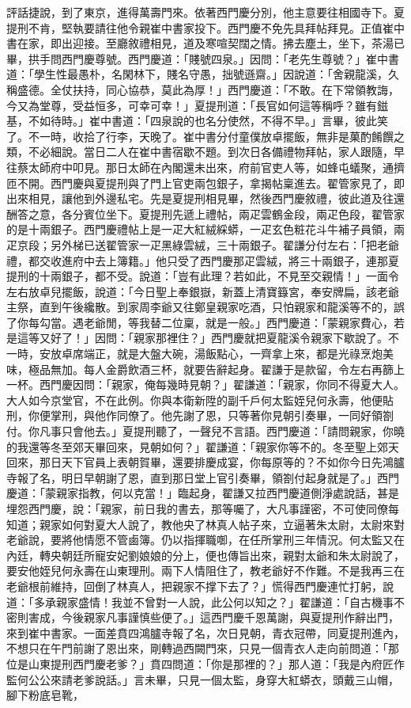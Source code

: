 \begin{showcontents}{}
評話捷說，到了東京，進得萬壽門來。依著西門慶分別，他主意要往相國寺下。夏提刑不肯，堅執要請往他令親崔中書家投下。西門慶不免先具拜帖拜見。正值崔中書在家，即出迎接。至廳敘禮相見，道及寒喧契闊之情。拂去塵土，坐下，茶湯已畢，拱手問西門慶尊號。西門慶道：「賤號四泉。」因問：「老先生尊號？」崔中書道：「學生性最愚朴，名閑林下，賤名守愚，拙號遜齋。」因說道：「舍親龍溪，久稱盛德。全仗扶持，同心協恭，莫此為厚！」西門慶道：「不敢。在下常領教誨，今又為堂尊，受益恒多，可幸可幸！」夏提刑道：「長官如何這等稱呼？雖有鎡基，不如待時。」崔中書道：「四泉說的也名分使然，不得不早。」言畢，彼此笑了。不一時，收拾了行李，天晚了。崔中書分付童僕放卓擺飯，無非是菓酌餚饌之類，不必細說。當日二人在崔中書宿歇不題。到次日各備禮物拜帖，家人跟隨，早往蔡太師府中叩見。那日太師在內閣還未出來，府前官吏人等，如蜂屯蟻聚，通擠匝不開。西門慶與夏提刑與了門上官吏兩包銀子，拿揭帖稟進去。翟管家見了，即出來相見，讓他到外邊私宅。先是夏提刑相見畢，然後西門慶敘禮，彼此道及往還酬答之意，各分賓位坐下。夏提刑先遞上禮帖，兩疋雲鶴金段，兩疋色段，翟管家的是十兩銀子。西門慶禮帖上是一疋大紅絨綵蟒，一疋玄色粧花斗牛補子員領，兩疋京段；另外梯已送翟管家一疋黑綠雲絨，三十兩銀子。翟謙分付左右：「把老爺禮，都交收進府中去上簿籍。」他只受了西門慶那疋雲絨，將三十兩銀子，連那夏提刑的十兩銀子，都不受。說道：「豈有此理？若如此，不見至交親情！」一面令左右放卓兒擺飯，說道：「今日聖上奉銀嶽，新蓋上清寶籙宮，奉安牌扁，該老爺主祭，直到午後纔散。到家周李爺又往鄭皇親家吃酒，只怕親家和龍溪等不的，誤了你每勾當。遇老爺閒，等我替二位稟，就是一般。」西門慶道：「蒙親家費心，若是這等又好了！」因問：「親家那裡住？」西門慶就把夏龍溪令親家下歇說了。不一時，安放卓席端正，就是大盤大碗，湯飯點心，一齊拿上來，都是光祿烹炮美味，極品無加。每人金爵飲酒三杯，就要告辭起身。翟謙于是款留，令左右再篩上一杯。西門慶因問：「親家，俺每幾時見朝？」翟謙道：「親家，你同不得夏大人。大人如今京堂官，不在此例。你與本衛新陞的副千戶何太監姪兒何永壽，他便貼刑，你便掌刑，與他作同僚了。他先謝了恩，只等著你見朝引奏畢，一同好領劄付。你凡事只會他去。」夏提刑聽了，一聲兒不言語。西門慶道：「請問親家，你曉的我還等冬至郊天畢回來，見朝如何？」翟謙道：「親家你等不的。冬至聖上郊天回來，那日天下官員上表朝賀畢，還要排慶成宴，你每原等的？不如你今日先鴻臚寺報了名，明日早朝謝了恩，直到那日堂上官引奏畢，領劄付起身就是了。」西門慶道：「蒙親家指教，何以克當！」臨起身，翟謙又拉西門慶道側淨處說話，甚是埋怨西門慶，說：「親家，前日我的書去，那等囑了，大凡事謹密，不可使同僚每知道；親家如何對夏大人說了，教他央了林真人帖子來，立逼著朱太尉，太尉來對老爺說，要將他情愿不管鹵簿。仍以指揮職啣，在任所掌刑三年情況。何太監又在內廷，轉央朝廷所寵安妃劉娘娘的分上，便也傳旨出來，親對太爺和朱太尉說了，要安他姪兒何永壽在山東理刑。兩下人情阻住了，教老爺好不作難。不是我再三在老爺根前維持，回倒了林真人，把親家不撑下去了？」慌得西門慶連忙打躬，說道：「多承親家盛情！我並不曾對一人說，此公何以知之？」翟謙道：「自古機事不密則害成，今後親家凡事謹慎些便了。」這西門慶千恩萬謝，與夏提刑作辭出門，來到崔中書家。一面差賁四鴻臚寺報了名，次日見朝，青衣冠帶，同夏提刑進內，不想只在午門前謝了恩出來，剛轉過西闕門來，只見一個青衣人走向前問道：「那位是山東提刑西門慶老爹？」賁四問道：「你是那裡的？」那人道：「我是內府匠作監何公公來請老爹說話。」言未畢，只見一個太監，身穿大紅蟒衣，頭戴三山帽，腳下粉底皂靴，
\end{showcontents}
